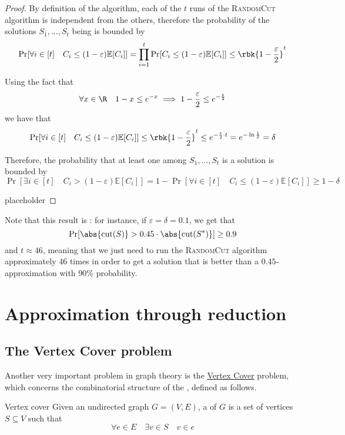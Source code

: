 \documentclass[a4paper, 12pt]{report}
\begin{document}
\begin{proof}
        By definition of the algorithm, each of the $t$ runs of the \textsc{RandomCut} algorithm is independent from the others, therefore the probability of  the solutions $S_1, \ldots, S_t$ being  is bounded by $$\Pr[\forall i \in [t]  \quad C_i \le (1 - \varepsilon) \mathbb E [C_i]] = \prod_{i = 1}^t{\Pr[C_i \le (1 - \varepsilon)\mathbb E[C_i]]} \le \rbk{1 - \dfrac{\varepsilon}{2}}^t$$

        Using the fact that $$\forall x \in \R \quad 1 - x \le e^{-x} \implies 1 - \frac{\varepsilon}{2} \le e^{- \frac{\varepsilon}{2}}$$ we have that $$\Pr[\forall i \in [t] \quad C_i \le (1 - \varepsilon) \mathbb E[C_i]] \le \rbk{1 - \dfrac{\varepsilon}{2}}^t \le e^{- \frac{\varepsilon}{2} \cdot t} = e^{- \ln {\frac{1}{\delta}}} = \delta$$

        Therefore, the probability that at least one among $S_1, \ldots, S_t$ is a  solution is bounded by $$\Pr[\exists i \in [t] \quad C_i > (1 - \varepsilon) \mathbb E [C_i]] = 1 - \Pr[\forall i \in [t] \quad C_i \le (1 - \varepsilon) \mathbb E [C_i]] \ge 1 - \delta$$

        placeholder 
    \end{proof}

    Note that this result is : for instance, if $\varepsilon = \delta = 0.1$, we get that $$\Pr[\abs{\mathrm{cut}(S)} > 0.45 \cdot \abs{\mathrm{cut}(S^*)}] \ge 0.9$$ and $t \approx 46$, meaning that we just need to run the \textsc{RandomCut} algorithm approximately 46 times in order to get a solution that is better than a $0.45$-approximation with $90\%$ probability.

    \section{Approximation through reduction}

    \subsection{The Vertex Cover problem}

    Another very important problem in graph theory is the \href{https://en.wikipedia.org/wiki/Vertex_cover}{Vertex Cover} problem, which concerns the combinatorial structure of the , defined as follows.

    \begin{frameddefn}{Vertex cover}
        Given an undirected graph $G = (V, E)$, a  of $G$ is a set of vertices $S \subseteq V$ such that $$\forall e \in E \quad \exists v \in S \quad v \in e$$
    \end{frameddefn}
\end{document}
